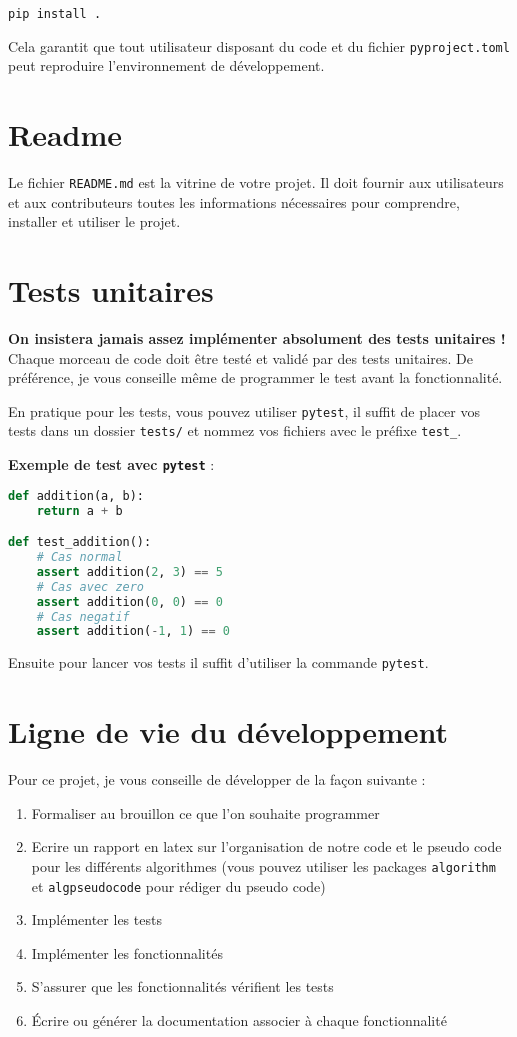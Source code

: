 \documentclass[a4paper,12pt]{article}
\begin{document}
\begin{lstlisting}
pip install .
\end{lstlisting}

Cela garantit que tout utilisateur disposant du code et du fichier \texttt{pyproject.toml} peut reproduire l'environnement de développement.

\section{Readme}

Le fichier \texttt{README.md} est la vitrine de votre projet. Il doit fournir aux utilisateurs et aux contributeurs toutes les informations nécessaires pour comprendre, installer et utiliser le projet. 

\section{Tests unitaires}

\textbf{On insistera jamais assez implémenter absolument des tests unitaires !} Chaque morceau de code doit être testé et validé par des tests unitaires. De préférence, je vous conseille même de programmer le test avant la fonctionnalité.


En pratique pour les tests, vous pouvez utiliser \texttt{pytest}, il suffit de placer vos tests dans un dossier \texttt{tests/} et nommez vos fichiers avec le préfixe \texttt{test\_}. 

\textbf{Exemple de test avec \texttt{pytest}} :

\begin{lstlisting}[language=python]
def addition(a, b):
    return a + b

def test_addition():
    # Cas normal
    assert addition(2, 3) == 5
    # Cas avec zero
    assert addition(0, 0) == 0
    # Cas negatif
    assert addition(-1, 1) == 0
\end{lstlisting}

Ensuite pour lancer vos tests il suffit d'utiliser la commande \texttt{pytest}.

\section{Ligne de vie du développement}

Pour ce projet, je vous conseille de développer de la façon suivante :

\begin{enumerate}
  \item Formaliser au brouillon ce que l'on souhaite programmer
  \item Ecrire un rapport en latex sur l'organisation de notre code et le pseudo code pour les différents algorithmes (vous pouvez utiliser les packages \texttt{algorithm} et \texttt{algpseudocode} pour rédiger du pseudo code)
  \item Implémenter les tests 
  \item Implémenter les fonctionnalités
  \item S'assurer que les fonctionnalités vérifient les tests
  \item Écrire ou générer la documentation associer à chaque fonctionnalité
\end{enumerate}
\end{document}
